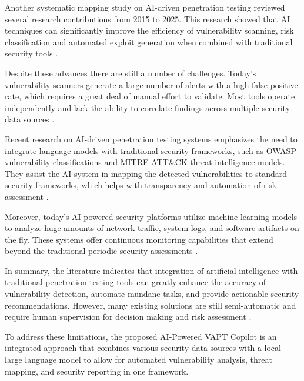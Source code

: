 \documentclass[journal]{IEEEtran}
\begin{document}
Another systematic mapping study on AI-driven penetration testing reviewed several research contributions from 2015 to 2025. This research showed that AI techniques can significantly improve the efficiency of vulnerability scanning, risk classification and automated exploit generation when combined with traditional security tools \cite{kumar2024ai}.

Despite these advances there are still a number of challenges. Today’s vulnerability scanners generate a large number of alerts with a high false positive rate, which requires a great deal of manual effort to validate. Most tools operate independently and lack the ability to correlate findings across multiple security data sources \cite{johnson2021automated,mcgraw2006software}.

Recent research on AI-driven penetration testing systems emphasizes the need to integrate language models with traditional security frameworks, such as OWASP vulnerability classifications and MITRE ATT\&CK threat intelligence models. They assist the AI system in mapping the detected vulnerabilities to standard security frameworks, which helps with transparency and automation of risk assessment \cite{zhang2024iris}.

Moreover, today’s AI-powered security platforms utilize machine learning models to analyze huge amounts of network traffic, system logs, and software artifacts on the fly. These systems offer continuous monitoring capabilities that extend beyond the traditional periodic security assessments \cite{provos2003hide}.

In summary, the literature indicates that integration of artificial intelligence with traditional penetration testing tools can greatly enhance the accuracy of vulnerability detection, automate mundane tasks, and provide actionable security recommendations. However, many existing solutions are still semi-automatic and require human supervision for decision making and risk assessment \cite{mahmoud2018network,petrovski2025mapping}.

To address these limitations, the proposed AI-Powered VAPT Copilot is an integrated approach that combines various security data sources with a local large language model to allow for automated vulnerability analysis, threat mapping, and security reporting in one framework.

\end{document}
